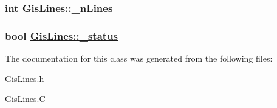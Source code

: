 \hypertarget{classGisLines_p1}{
\subsubsection[\_\-nLines]{\setlength{\rightskip}{0pt plus 5cm}int \hyperlink{classGisLines_p1}{Gis\-Lines::\_\-n\-Lines}}}
\label{classGisLines_p1}


\hypertarget{classGisLines_p0}{
\subsubsection[\_\-status]{\setlength{\rightskip}{0pt plus 5cm}bool \hyperlink{classGisLines_p0}{Gis\-Lines::\_\-status}}}
\label{classGisLines_p0}




The documentation for this class was generated from the following files:\begin{CompactItemize}
\item 
\hyperlink{GisLines_8h}{Gis\-Lines.h}\item 
\hyperlink{GisLines_8C}{Gis\-Lines.C}\end{CompactItemize}
